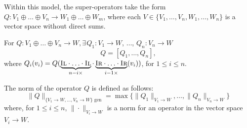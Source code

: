Within this model, the super-operators take the form $Q: V_1 \oplus \ldots \oplus V_n  \rightarrow  W_1 \oplus \ldots \oplus W_m$, where each $V \in \{V_1, \ldots, V_n, W_1, \ldots, W_n\}$ is a vector space without direct sums.

\begin{definition} \label{def:gen_norm_either}
For $Q: V_1 \oplus \ldots \oplus V_n  \rightarrow W, \exists \hspace{1pt} Q_1: V_1 \rightarrow W$, $\ldots$, $Q_n: V_n \rightarrow W$  
$$Q=[Q_1, \ldots, Q_n],$$ 
where $Q_i (v_i) = Q (\underbrace{\textsc{Il} \cdot \ldots \cdot \textsc{Il}}_{n-i \times }  \cdot  \underbrace{\textsc{Ir} \cdot \ldots \cdot \textsc{Ir}}_{i-1 \times } (v_i))$, for $ 1 \leq i \leq n$.

The norm of the operator $Q$ is defined as follows:
\begin{equation}
\|Q\|_{\{V_1\rightarrow W, \ldots, V_n\rightarrow W\} \text{ gen}} = \max \{\|Q_1\|_{V_1 \rightarrow W}, \ldots, \|Q_n\|_{V_n \rightarrow W}  \}
\end{equation}
where, for $1 \leq i \leq n $, $\|\cdot \|_{V_i \rightarrow W}$ is a norm for an operator in the vector space $V_i \rightarrow W$.
\end{definition}

